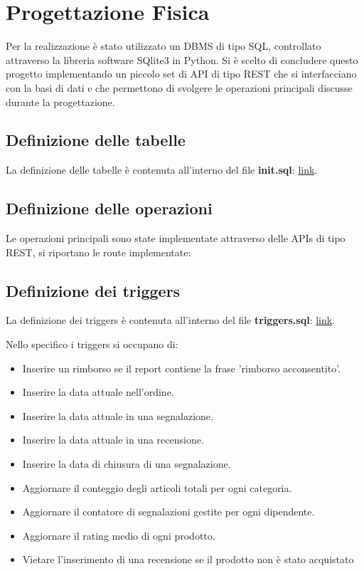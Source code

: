 \section{Progettazione Fisica}

Per la realizzazione è stato utilizzato un DBMS di tipo SQL, controllato attraverso la libreria software SQlite3 in Python. Si è scelto di concludere questo progetto implementando un piccolo set di API di tipo REST che si interfacciano con la basi di dati e che permettono di svolgere le operazioni principali discusse durante la progettazione. 

\subsection{Definizione delle tabelle}
La definizione delle tabelle è contenuta all'interno del file \textbf{init.sql}: \href{https://github.com/krosspile/ecommerce_database/blob/master/src/database/init.sql}{link}.

\subsection{Definizione delle operazioni}

Le operazioni principali sono state implementate attraverso delle APIs di tipo REST, si riportano le route implementate:




\subsection{Definizione dei triggers}

La definizione dei triggers è contenuta all'interno del file \textbf{triggers.sql}: \href{https://github.com/krosspile/ecommerce_database/blob/master/src/database/triggers.sql}{link}.

Nello specifico i triggers si occupano di:\\
\begin{itemize}
    \item Inserire un rimborso se il report contiene la frase 'rimborso acconsentito'.
    \item Inserire la data attuale nell'ordine.
    \item Inserire la data attuale in una segnalazione.
    \item Inserire la data attuale in una recensione.
    \item Inserire la data di chiusura di una segnalazione.
    \item Aggiornare il conteggio degli articoli totali per ogni categoria.
    \item Aggiornare il contatore di segnalazioni gestite per ogni dipendente.
    \item Aggiornare il rating medio di ogni prodotto.
    \item Vietare l'inserimento di una recensione se il prodotto non è stato acquistato
\end{itemize}

